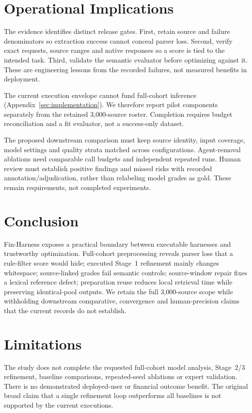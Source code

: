\documentclass[11pt]{article}
\begin{document}
\section{Operational Implications}
The evidence identifies distinct release gates. First, retain source and
failure denominators so extraction success cannot conceal parser loss.
Second, verify exact requests, source ranges and native responses so a
score is tied to the intended task. Third, validate the semantic evaluator
before optimizing against it. These are engineering lessons from the
recorded failures, not measured benefits in deployment.

The current execution envelope cannot fund full-cohort inference
(Appendix~\ref{sec:implementation}). We therefore report pilot components
separately from the retained 3,000-source roster. Completion requires
budget reconciliation and a fit evaluator, not a success-only dataset.

The proposed downstream comparison must keep source identity, input
coverage, model settings and quality strata matched across configurations.
Agent-removal ablations need comparable call budgets and independent
repeated runs. Human review must establish positive findings and missed
risks with recorded annotation/adjudication, rather than relabeling model
grades as gold. These remain requirements, not completed experiments.

\section{Conclusion}
Fin-Harness exposes a practical boundary between executable harnesses and
trustworthy optimization. Full-cohort preprocessing reveals parser loss
that a rule-filter score would hide; executed Stage~1 refinement mainly
changes whitespace; source-linked grades fail semantic controls;
source-window repair fixes a lexical reference defect; preparation reuse
reduces local retrieval time while preserving identical-pool outputs.
We retain the full 3,000-source scope while withholding downstream
comparative, convergence and human-precision claims that the current
records do not establish.

\clearpage
\section*{Limitations}
The study does not complete the requested full-cohort model analysis,
Stage~2/3 refinement, baseline comparisons, repeated-seed ablations or
expert validation. There is no demonstrated deployed-user or financial
outcome benefit. The original broad claim that a single refinement loop
outperforms all baselines is not supported by the current executions.
\end{document}

